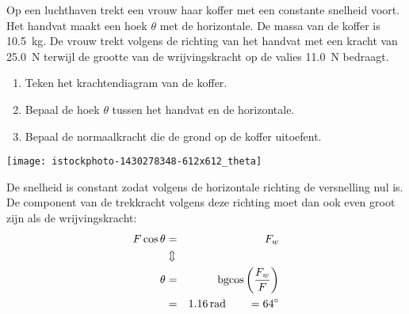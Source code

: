 \documentclass{ximera}
\begin{document}
\begin{exercise}
	Op een luchthaven trekt een vrouw haar koffer met een constante snelheid voort. Het handvat maakt een hoek $\theta$ met de horizontale. De massa van de koffer is \SI{10,5}{kg}. De vrouw trekt volgens de richting van het handvat met een kracht van \SI{25,0}{N} terwijl de grootte van de wrijvingskracht op de valies \SI{11,0}{N} bedraagt.

	\begin{minipage}[c]{.7\linewidth}
		\begin{enumerate}
			\item Teken het krachtendiagram van de koffer.%
			\item Bepaal de hoek $\theta$ tussen het handvat en de horizontale.
			\item Bepaal de normaalkracht die de grond op de koffer uitoefent.
		\end{enumerate}
	\end{minipage}
	\hfill
	\begin{minipage}{.2\linewidth}
	\begin{image}
			\texttt{[image: istockphoto-1430278348-612x612\_theta]}%
	\end{image}
	\end{minipage}
	\begin{oplossing}
	De snelheid is constant zodat volgens de horizontale richting de versnelling nul is. De component van de trekkracht volgens deze richting moet dan ook even groot zijn als de wrijvingskracht:
	\begin{eqnarray*}
		F\cos{\theta}&=&F_w\\
		&\Updownarrow&\\
		\theta &=& {\rm bgcos}\left(\frac{F_w}{F}\right)\\
		&=& \SI{1,16}{rad}\qquad =\SI{64}{\degree}
	\end{eqnarray*}

\end{oplossing}
\end{exercise}
\end{document}

